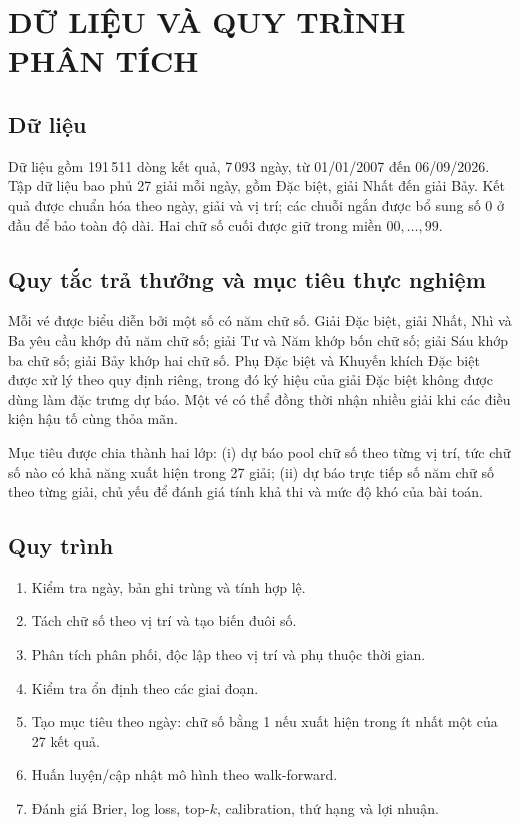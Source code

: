 \chapter{DỮ LIỆU VÀ QUY TRÌNH PHÂN TÍCH}
\section{Dữ liệu}
Dữ liệu gồm 191\,511 dòng kết quả, 7\,093 ngày, từ 01/01/2007 đến 06/09/2026. Tập dữ liệu bao phủ 27 giải mỗi ngày, gồm Đặc biệt, giải Nhất đến giải Bảy. Kết quả được chuẩn hóa theo ngày, giải và vị trí; các chuỗi ngắn được bổ sung số 0 ở đầu để bảo toàn độ dài. Hai chữ số cuối được giữ trong miền $00,\ldots,99$.

\section{Quy tắc trả thưởng và mục tiêu thực nghiệm}
Mỗi vé được biểu diễn bởi một số có năm chữ số. Giải Đặc biệt, giải Nhất, Nhì và Ba yêu cầu khớp đủ năm chữ số; giải Tư và Năm khớp bốn chữ số; giải Sáu khớp ba chữ số; giải Bảy khớp hai chữ số. Phụ Đặc biệt và Khuyến khích Đặc biệt được xử lý theo quy định riêng, trong đó ký hiệu của giải Đặc biệt không được dùng làm đặc trưng dự báo. Một vé có thể đồng thời nhận nhiều giải khi các điều kiện hậu tố cùng thỏa mãn.

Mục tiêu được chia thành hai lớp: (i) dự báo pool chữ số theo từng vị trí, tức chữ số nào có khả năng xuất hiện trong 27 giải; (ii) dự báo trực tiếp số năm chữ số theo từng giải, chủ yếu để đánh giá tính khả thi và mức độ khó của bài toán.

\section{Quy trình}
\begin{enumerate}
\item Kiểm tra ngày, bản ghi trùng và tính hợp lệ.
\item Tách chữ số theo vị trí và tạo biến đuôi số.
\item Phân tích phân phối, độc lập theo vị trí và phụ thuộc thời gian.
\item Kiểm tra ổn định theo các giai đoạn.
\item Tạo mục tiêu theo ngày: chữ số bằng 1 nếu xuất hiện trong ít nhất một của 27 kết quả.
\item Huấn luyện/cập nhật mô hình theo walk-forward.
\item Đánh giá Brier, log loss, top-$k$, calibration, thứ hạng và lợi nhuận.
\end{enumerate}

